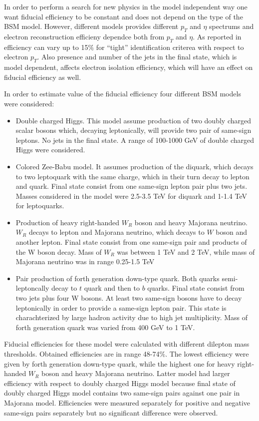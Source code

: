 In order to perform a search for new physics in the model independent way one want fiducial efficiency to be constant and does not depend on the type of the BSM model.
However, different models provides different $p_T$ and $\eta$ spectrums and electron reconstruction efficieny dependce both from $p_T$ and $\eta$.
As reported in~\cite{electron_tight} efficiency can vary up to 15$\%$ for ``tight'' identification criterea with respect to electron $p_T$.
Also presence and number of the jets in the final state, which is model dependent, affects electron isolation efficiency, which will have an effect on 
fiducial efficiency as well.

In order to estimate value of the fiducial efficiency four different BSM models were considered:
\begin{itemize}
 \item Double charged Higgs. This model assume production of two doubly charged scalar bosons which, decaying leptonically, will provide two pair of same-sign leptons.
 No jets in the final state. A range of 100-1000 GeV of double charged Higgs were considered.
 \item Colored Zee-Babu model. It assumes production of the diquark, which decays to two leptoquark with the same charge, 
 which in their turn decay to lepton and quark. Final state consist from one same-sign lepton pair plus two jets.
 Masses considered in the model were 2.5-3.5 TeV for diquark and 1-1.4 TeV for leptoquarks.
 \item Production of heavy right-handed $W_R$ boson and heavy Majorana neutrino. $W_R$ decays to lepton and Majorana neutrino, 
 which decays to $W$ boson and another lepton. Final state consist from one same-sign pair and products of the W boson decay.
 Mass of $W_R$ was between 1 TeV and 2 TeV, while mass of Majorana neutrino was in range 0.25-1.5 TeV
 \item Pair production of forth generation down-type quark. Both quarks semi-leptoncally decay to $t$ quark and then to $b$ quarks.
 Final state consist from two jets plus four W bosons. At least two same-sign bosons have to decay leptonically in order to provide a same-sign lepton pair.
 This state is charachterized by large hadron activity due to high jet multiplicity.
 Mass of forth generation quark was varied from 400 GeV to 1 TeV.
\end{itemize}
Fiducial efficiencies for these model were calculated with different dilepton mass thresholds.
Obtained efficiencies are in range 48-74$\%$. The lowest efficiency were given by forth generation down-type quark, while the highest one 
for heavy right-handed $W_R$ boson and heavy Majorana neutrino. Latter model had larger efficiency with respect to doubly charged Higgs model
because final state of doubly charged Higgs model contains two same-sign pairs against one pair in Majorana model.
Efficiencies were measured separately for positive and negative same-sign pairs separately but no significant difference were observed.

